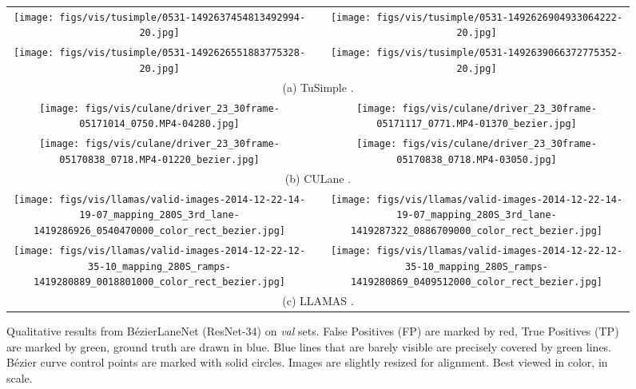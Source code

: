 \documentclass[10pt,twocolumn,letterpaper]{article}
\begin{document}
\def\imh{2.8cm}
\begin{figure*}[ht]
\renewcommand{\tabcolsep}{1pt}
\centering
    \begin{tabular}{ccc}
    \texttt{[image: figs/vis/tusimple/0531-1492637454813492994-20.jpg]}&&
    \texttt{[image: figs/vis/tusimple/0531-1492626904933064222-20.jpg]}\\
    \texttt{[image: figs/vis/tusimple/0531-1492626551883775328-20.jpg]}&&
    \texttt{[image: figs/vis/tusimple/0531-1492639066372775352-20.jpg]}\\
    \multicolumn{3}{c}{(a) TuSimple \cite{tusimple}.}\\
    \texttt{[image: figs/vis/culane/driver\_23\_30frame-05171014\_0750.MP4-04280.jpg]}&&
    \texttt{[image: figs/vis/culane/driver\_23\_30frame-05171117\_0771.MP4-01370\_bezier.jpg]}\\
    \texttt{[image: figs/vis/culane/driver\_23\_30frame-05170838\_0718.MP4-01220\_bezier.jpg]}&&
    \texttt{[image: figs/vis/culane/driver\_23\_30frame-05170838\_0718.MP4-03050.jpg]}\\
    \multicolumn{3}{c}{(b) CULane \cite{pan2018spatial}.}\\
    \texttt{[image: figs/vis/llamas/valid-images-2014-12-22-14-19-07\_mapping\_280S\_3rd\_lane-1419286926\_0540470000\_color\_rect\_bezier.jpg]}&&
    \texttt{[image: figs/vis/llamas/valid-images-2014-12-22-14-19-07\_mapping\_280S\_3rd\_lane-1419287322\_0886709000\_color\_rect\_bezier.jpg]}\\
    \texttt{[image: figs/vis/llamas/valid-images-2014-12-22-12-35-10\_mapping\_280S\_ramps-1419280889\_0018801000\_color\_rect\_bezier.jpg]}&&
    \texttt{[image: figs/vis/llamas/valid-images-2014-12-22-12-35-10\_mapping\_280S\_ramps-1419280869\_0409512000\_color\_rect\_bezier.jpg]}\\
    \multicolumn{3}{c}{(c) LLAMAS \cite{llamas2019}.}\\
    \end{tabular}
    \vspace{-1mm}
\caption{Qualitative results from BézierLaneNet (ResNet-34) on \textit{val} sets. False Positives (FP) are marked by red, True Positives (TP) are marked by green, ground truth are drawn in blue. Blue lines that are barely visible are precisely covered by green lines. Bézier curve control points are marked with solid circles. Images are slightly resized for alignment. Best viewed in color, in  scale.}
\vspace{-5mm}

\label{fig:visall}
\end{figure*}
\end{document}
